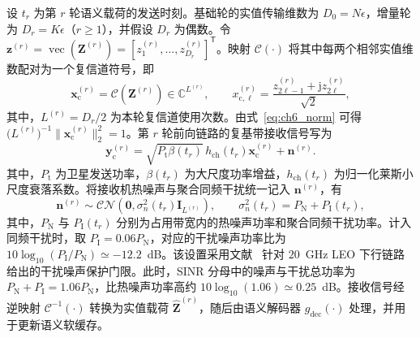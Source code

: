 设 $t_r$ 为第 $r$ 轮语义载荷的发送时刻。基础轮的实值传输维数为 $D_0=N\epsilon$，增量轮为 $D_r=K\epsilon$（$r\geq1$），并假设 $D_r$ 为偶数。令 $\mathbf z^{(r)}=\operatorname{vec}(\mathbf Z^{(r)})=[z_1^{(r)},\ldots,z_{D_r}^{(r)}]^{\mathsf T}$。映射 $\mathcal C(\cdot)$ 将其中每两个相邻实值维数配对为一个复信道符号，即
\begin{equation}\label{eq:ch6_channel_input}
\mathbf x_{\mathrm c}^{(r)}=\mathcal C\!\left(\mathbf Z^{(r)}\right)
\in\mathbb C^{L^{(r)}},\qquad
x_{\mathrm c,\ell}^{(r)}
=\frac{z_{2\ell-1}^{(r)}+\mathrm jz_{2\ell}^{(r)}}{\sqrt{2}},
\end{equation}
其中，$L^{(r)}=D_r/2$ 为本轮复信道使用次数。由式~\eqref{eq:ch6_norm} 可得 $\bigl(L^{(r)}\bigr)^{-1}\lVert\mathbf x_{\mathrm c}^{(r)}\rVert_2^2=1$。第 $r$ 轮前向链路的复基带接收信号写为
\begin{equation}\label{eq:ch6_channel}
\mathbf y_{\mathrm c}^{(r)}
=\sqrt{P_{\mathrm t}\beta(t_r)}\,
h_{\mathrm{ch}}(t_r)\mathbf x_{\mathrm c}^{(r)}
+\mathbf n^{(r)}.
\end{equation}
其中，$P_{\mathrm t}$ 为卫星发送功率，$\beta(t_r)$ 为大尺度功率增益，$h_{\mathrm{ch}}(t_r)$ 为归一化莱斯小尺度衰落系数。将接收机热噪声与聚合同频干扰统一记入 $\mathbf n^{(r)}$，有
\begin{equation}\label{eq:ch6_aggregate_noise}
\mathbf n^{(r)}\sim\mathcal{CN}\!\left(
\mathbf 0,\sigma_n^2(t_r)\mathbf I_{L^{(r)}}
\right),\qquad
\sigma_n^2(t_r)=P_{\mathrm N}+P_{\mathrm I}(t_r),
\end{equation}
其中，$P_{\mathrm N}$ 与 $P_{\mathrm I}(t_r)$ 分别为占用带宽内的热噪声功率和聚合同频干扰功率。计入同频干扰时，取 $P_{\mathrm I}=0.06P_{\mathrm N}$，对应的干扰噪声功率比为 $10\log_{10}(P_{\mathrm I}/P_{\mathrm N})\simeq-12.2$~dB。该设置采用文献~\cite{Kim-InBandCoexistence-TWC25} 针对 $20$~GHz LEO 下行链路给出的干扰噪声保护门限。此时，SINR 分母中的噪声与干扰总功率为 $P_{\mathrm N}+P_{\mathrm I}=1.06P_{\mathrm N}$，比热噪声功率高约 $10\log_{10}(1.06)\simeq0.25$~dB。接收信号经逆映射 $\mathcal C^{-1}(\cdot)$ 转换为实值载荷 $\hat{\mathbf Z}^{(r)}$，随后由语义解码器 $g_{\mathrm{dec}}(\cdot)$ 处理，并用于更新语义软缓存。

